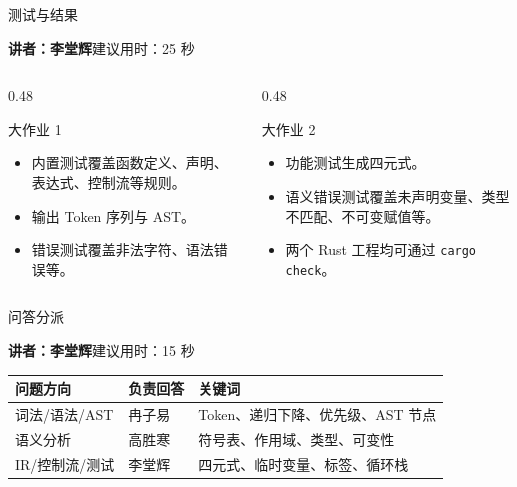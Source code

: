 \documentclass[aspectratio=169]{ctexbeamer}
\newcommand{\speaker}[2]{%
    \vspace{-0.4em}
    \begin{flushright}
        \scriptsize\color{mainblue}\textbf{讲者：#1}\quad 建议用时：#2
    \end{flushright}
    \vspace{-0.7em}
}
\begin{document}
\begin{frame}{测试与结果}
    \speaker{李堂辉}{25 秒}
    \begin{columns}[T]
    \begin{column}{0.48\textwidth}
        \begin{block}{大作业 1}
            \begin{itemize}
                \item 内置测试覆盖函数定义、声明、表达式、控制流等规则。
                \item 输出 Token 序列与 AST。
                \item 错误测试覆盖非法字符、语法错误等。
            \end{itemize}
        \end{block}
    \end{column}
    \begin{column}{0.48\textwidth}
        \begin{block}{大作业 2}
            \begin{itemize}
                \item 功能测试生成四元式。
                \item 语义错误测试覆盖未声明变量、类型不匹配、不可变赋值等。
                \item 两个 Rust 工程均可通过 \texttt{cargo check}。
            \end{itemize}
        \end{block}
    \end{column}
    \end{columns}
\end{frame}

\begin{frame}{问答分派}
    \speaker{李堂辉}{15 秒}
    \begin{table}
    \centering
    \small
    \begin{tabular}{p{3.0cm}p{4.2cm}p{4.5cm}}
        \toprule
        \textbf{问题方向} & \textbf{负责回答} & \textbf{关键词} \\
        \midrule
        词法/语法/AST & 冉子易 & Token、递归下降、优先级、AST 节点 \\
        语义分析 & 高胜寒 & 符号表、作用域、类型、可变性 \\
        IR/控制流/测试 & 李堂辉 & 四元式、临时变量、标签、循环栈 \\
        \bottomrule
    \end{tabular}
    \end{table}
\end{frame}
\end{document}
